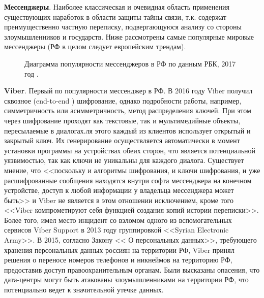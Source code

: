 \textbf{Мессенджеры}. Наиболее классическая и очевидная область применения существующих наработок в области защиты тайны связи, т.к. содержат преимущественно частную переписку, подвергающуюся анализу со стороны злоумышленников и государств.  Ниже рассмотрены самые популярные мировые мессенджеры (РФ в целом следует европейским трендам). \cite{PopApp} %
\begin{figure*}[h!]
	\caption{Диаграмма популярности мессенджеров в РФ по данным РБК, 2017 год \cite{PopAppRus} .}
\end{figure*} 
\textbf{Viber}. Первый по популярности мессенджер  в РФ. В 2016 году Viber получил сквозное (end-to-end ) шифрование, однако подробности работы, например, симметричность или асимметричность, метод распределения ключей.  При этом через шифрование проходят как текстовые, так и мультимедийные объекты, пересылаемые в диалогах.ля этого каждый из клиентов использует открытый и закрытый ключ. Их генерирование осуществляется автоматически в момент установки программы на устройствах обеих сторон, что является потенциальной уязвимостью, так как ключи не уникальны для каждого диалога.%
Существует мнение, что <<поскольку и алгоритмы шифрования, и ключи шифрования, и уже расшифрованные сообщения находятся внутри софта мессенджера на конечном устройстве, доступ к любой информации у владельца мессенджера может быть>> и Viber не является в этом отношении исключением, кроме того <<Viber компрометируют себя функцией создания копий истории переписки>>. \cite{Viber} %
Более того, имел место инцидент со взломом одного из вспомогательных сервисов Viber Support в 2013 году группировкой <<Syrian Electronic Army>>. %
В 2015, согласно Закону << О персональных данных>>, требующего хранения персональных данных россиян на территории РФ, Viber принял решения о переносе номеров телефонов и никнеймов на территорию РФ, предоставив доступ правоохранительным органам. Были высказаны опасения, что дата-центры могут быть атакованы злоумышленниками на территории РФ, что потенциально ведет к значительной утечке данных. %

